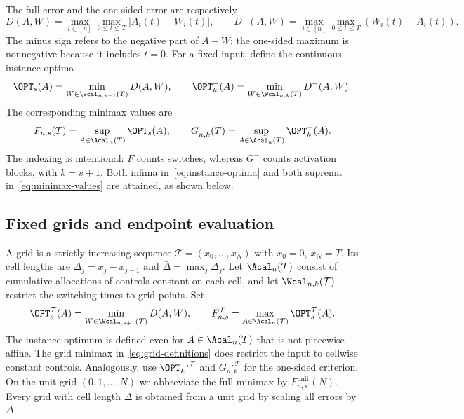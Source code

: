 The full error and the one-sided error are respectively
\begin{equation}\label{eq:errors}
 D(A,W)=\max_{i\in[n]}\max_{0\le t\le T}|A_i(t)-W_i(t)|,
 \qquad
 D^-(A,W)=\max_{i\in[n]}\max_{0\le t\le T}(W_i(t)-A_i(t)).
\end{equation}
The minus sign refers to the negative part of $A-W$; the one-sided
maximum is nonnegative because it includes $t=0$.
For a fixed input, define the continuous instance optima
\begin{equation}\label{eq:instance-optima}
 \OPT_s(A)=\min_{W\in\Wcal_{n,s+1}(T)}D(A,W),\qquad
 \OPT^-_k(A)=\min_{W\in\Wcal_{n,k}(T)}D^-(A,W).
\end{equation}
The corresponding minimax values are
\begin{equation}\label{eq:minimax-values}
 F_{n,s}(T)=\sup_{A\in\Acal_n(T)}\OPT_s(A),\qquad
 G^-_{n,k}(T)=\sup_{A\in\Acal_n(T)}\OPT^-_k(A).
\end{equation}
The indexing is intentional: $F$ counts switches, whereas $G^-$ counts
activation blocks, with $k=s+1$. Both infima in~\eqref{eq:instance-optima}
and both suprema in~\eqref{eq:minimax-values} are attained, as shown below.

\subsection{Fixed grids and endpoint evaluation}

A grid is a strictly increasing sequence
$\mathcal T=(x_0,\ldots,x_N)$ with $x_0=0$, $x_N=T$. Its cell lengths are
$\Delta_j=x_j-x_{j-1}$ and $\bar\Delta=\max_j\Delta_j$.
Let $\Acal_n(\mathcal T)$ consist of cumulative allocations of controls
constant on each cell, and let $\Wcal_{n,k}(\mathcal T)$ restrict the switching
times to grid points. Set
\begin{equation}\label{eq:grid-definitions}
 \OPT_s^{\mathcal T}(A)=
 \min_{W\in\Wcal_{n,s+1}(\mathcal T)}D(A,W),\qquad
 F^{\mathcal T}_{n,s}=
 \max_{A\in\Acal_n(\mathcal T)}\OPT_s^{\mathcal T}(A).
\end{equation}
The instance optimum is defined even for $A\in\Acal_n(T)$ that is not
piecewise affine. The grid minimax in~\eqref{eq:grid-definitions} does restrict
the input to cellwise constant controls. Analogously, use
$\OPT_k^{-,\mathcal T}$ and $G_{n,k}^{-,\mathcal T}$ for the one-sided
criterion. On the unit grid $(0,1,\ldots,N)$ we abbreviate the full minimax by
$F^{\mathrm{unit}}_{n,s}(N)$. Every grid with cell length $\Delta$ is obtained
from a unit grid by scaling all errors by $\Delta$.

